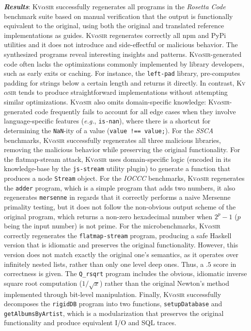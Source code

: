 \documentclass[nonacm,sigplan,review]{acmart}
\def\eg{{\em e.g.}, }
\newcommand{\sys}{{\scshape Kv{$\alpha$}sir}\xspace}
\newcommand{\heading}[1]{\vspace{2pt}\noindent\textbf{\emph{#1}}:\enspace}
\newcommand{\ttt}[1]{\texttt{#1}\xspace}
\begin{document}
\heading{Results}
\sys successfully regenerates all programs in the \textit{Rosetta Code} benchmark suite
based on manual verification that the output is functionally equivalent
to the original, using both the original and translated reference implementations as guides.
\sys regenerates correctly all npm and PyPi utilities and it does not introduce and side-effectful or malicious behavior.
The synthesized programs reveal interesting insights and patterns.
\sys-generated code often lacks the optimizations commonly
implemented by library developers, such as early exits or caching.
For instance, the \ttt{left-pad} library, pre-computes padding for strings below a certain length
and returns it directly.
In contrast, \sys tends to produce straightforward
implementations without attempting similar optimizations.
\sys also omits domain-specific knowledge:
\sys-generated code frequently fails to account for all edge cases when they involve language-specific features (\eg \ttt{is-nan}), where there is a shortcut for determining 
the \ttt{NaN}-ity of a value (\ttt{value !== value;}).
For the \textit{SSCA} benchmarks, \sys successfully regenerates all three malicious libraries, removing the malicious behavior while preserving the original functionality.
For the flatmap-stream attack, \sys uses domain-specific logic (encoded in its knowledge-base by the \ttt{js-stream} utility plugin) to generate a function that produces a node \ttt{Stream} object.
For the \textit{IOCCC} benchmarks, \sys regenerates the \ttt{adder} program, which is a simple program that adds two numbers,
it also regenerates \ttt{mersenne} in regards that it correctly performs a naive Mersenne primality testing, but it does not follow the non-obvious output scheme of the original program, which returns a non-zero hexadecimal number when $2^p - 1$ ($p$ being the input number) is not prime.
For the microbenchmarks, \sys correctly regenerates the \ttt{flatmap-stream} program, producing a safe Haskell version that is idiomatic and preserves the original functionality.
However, this version does not match exactly the original one's semantics, as it operates over infinitely nested lists, rather than only one level deep ones.
Thus, a $.5$ score in correctness is given.
The \ttt{Q\_rsqrt} program includes the obvious, idiomatic inverse square root computation ($1/\sqrt{x}$) rather than the original Newton's method implemented through bit-level manipulation.
Finally, \sys successfully decomposes the \ttt{rigidDB} program into two
functions, \ttt{setupDatabase} and \ttt{getAlbumsByArtist}, which is a
modularization that preserves the original functionality and produce equivalent I/O and SQL traces.
\end{document}
